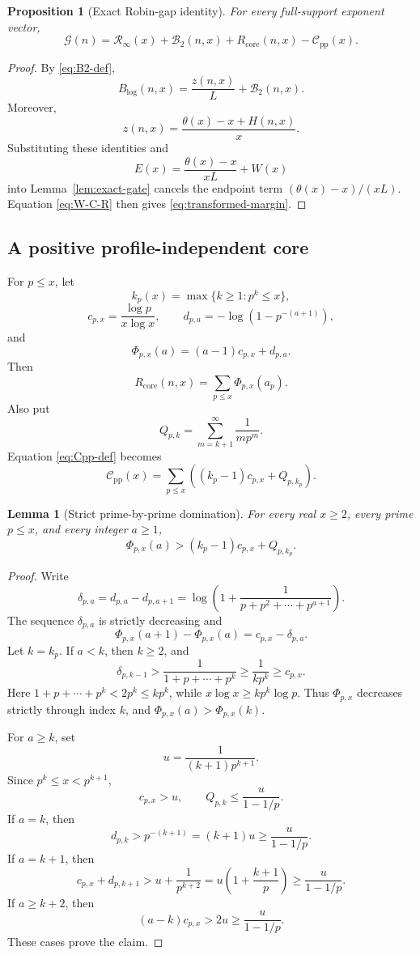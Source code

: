 \documentclass[11pt,a4paper]{article}
\numberwithin{equation}{section}
\newtheorem{proposition}[theorem]{Proposition}
\newtheorem{lemma}[theorem]{Lemma}
\theoremstyle{definition}
\newcommand{\Rinf}{\mathcal R_{\infty}}
\newcommand{\Btwo}{\mathcal B_{2}}
\newcommand{\Cpi}{\mathcal C_{\mathrm{pp}}}
\newcommand{\Ggap}{\mathcal G}
\begin{document}
\begin{proposition}[Exact Robin-gap identity]\label{prop:transformed-margin}
For every full-support exponent vector,
\begin{equation}\label{eq:transformed-margin}
  \boxed{
  \Ggap(n)
  =
  \Rinf(x)+\Btwo(n,x)
  +R_{\mathrm{core}}(n,x)-\Cpi(x).
  }
\end{equation}
\end{proposition}

\begin{proof}
By \eqref{eq:B2-def},
\[
  B_{\log}(n,x)
  =
  \frac{z(n,x)}L+\Btwo(n,x).
\]
Moreover,
\[
  z(n,x)
  =
  \frac{\theta(x)-x+H(n,x)}x.
\]
Substituting these identities and
\[
  E(x)=\frac{\theta(x)-x}{xL}+W(x)
\]
into Lemma~\ref{lem:exact-gate} cancels the endpoint term
\((\theta(x)-x)/(xL)\).  Equation \eqref{eq:W-C-R} then gives
\eqref{eq:transformed-margin}.
\end{proof}

\subsection{A positive profile-independent core}

For \(p\le x\), let
\[
  k_p(x)=\max\{k\ge1:p^k\le x\},
\]
\[
  c_{p,x}=\frac{\log p}{x\log x},
  \qquad
  d_{p,a}=-\log\left(1-p^{-(a+1)}\right),
\]
and
\[
  \Phi_{p,x}(a)=(a-1)c_{p,x}+d_{p,a}.
\]
Then
\[
  R_{\mathrm{core}}(n,x)=\sum_{p\le x}\Phi_{p,x}(a_p).
\]
Also put
\[
  Q_{p,k}
  =
  \sum_{m=k+1}^{\infty}\frac1{mp^m}.
\]
Equation \eqref{eq:Cpp-def} becomes
\begin{equation}\label{eq:Cpp-prime-sum}
  \Cpi(x)
  =
  \sum_{p\le x}
  \left((k_p-1)c_{p,x}+Q_{p,k_p}\right).
\end{equation}

\begin{lemma}[Strict prime-by-prime domination]\label{lem:prime-domination}
For every real \(x\ge2\), every prime \(p\le x\), and every integer \(a\ge1\),
\[
  \Phi_{p,x}(a)>
  (k_p-1)c_{p,x}+Q_{p,k_p}.
\]
\end{lemma}

\begin{proof}
Write
\[
  \delta_{p,a}
  =
  d_{p,a}-d_{p,a+1}
  =
  \log\left(
  1+\frac1{p+p^2+\cdots+p^{a+1}}
  \right).
\]
The sequence \(\delta_{p,a}\) is strictly decreasing and
\[
  \Phi_{p,x}(a+1)-\Phi_{p,x}(a)
  =
  c_{p,x}-\delta_{p,a}.
\]
Let \(k=k_p\).  If \(a<k\), then \(k\ge2\), and
\[
  \delta_{p,k-1}>
  \frac1{1+p+\cdots+p^k}
  \ge\frac1{kp^k}
  \ge c_{p,x}.
\]
Here \(1+p+\cdots+p^k<2p^k\le kp^k\), while
\(x\log x\ge kp^k\log p\).
Thus \(\Phi_{p,x}\) decreases strictly through index \(k\), and
\(\Phi_{p,x}(a)>\Phi_{p,x}(k)\).

For \(a\ge k\), set
\[
  u=\frac1{(k+1)p^{k+1}}.
\]
Since \(p^k\le x<p^{k+1}\),
\[
  c_{p,x}>u,
  \qquad
  Q_{p,k}\le\frac{u}{1-1/p}.
\]
If \(a=k\), then
\[
  d_{p,k}>p^{-(k+1)}
  =(k+1)u\ge\frac{u}{1-1/p}.
\]
If \(a=k+1\), then
\[
  c_{p,x}+d_{p,k+1}
  >
  u+\frac1{p^{k+2}}
  =
  u\left(1+\frac{k+1}{p}\right)
  \ge\frac{u}{1-1/p}.
\]
If \(a\ge k+2\), then
\[
  (a-k)c_{p,x}>2u\ge\frac{u}{1-1/p}.
\]
These cases prove the claim.
\end{proof}
\end{document}
